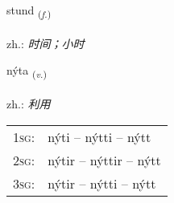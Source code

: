 \documentclass[frontgrid, backgrid]{flacards}\usepackage[]{graphicx}\usepackage[]{xcolor}
\begin{document}
\renewcommand{\flhead}{\vskip5pt \fboxsep=0pt {\small\bfseries\footnotesize Nafnorð | 名词}}
\renewcommand{\fcfoot}{\vskip5pt \fboxsep=0pt \hspace{2pt}{\small\bfseries\footnotesize 1K}}

\renewcommand{\blhead}{\vskip5pt {\small\bfseries\footnotesize Nafnorð | 名词 }}
\renewcommand{\bcfoot}{\vskip5pt \hspace{2pt}{\small\bfseries\footnotesize 1K}}


{stund \small{\textsubscript{(\textit{f.})}} \\[1ex] %
\textphonetic{[stʏnt]} \\
zh.: \emph{时间；小时} \\  [2ex]
\renewcommand*{\arraystretch}{0.8}
}

\renewcommand{\flhead}{\vskip5pt \fboxsep=0pt {\small\bfseries\footnotesize Sagnorð | 动词}}
\renewcommand{\fcfoot}{\vskip5pt \fboxsep=0pt \hspace{2pt}{\small\bfseries\footnotesize 1K}}

\renewcommand{\blhead}{\vskip5pt {\small\bfseries\footnotesize Sagnorð | 动词 }}
\renewcommand{\bcfoot}{\vskip5pt \hspace{2pt}{\small\bfseries\footnotesize 1K}}


{nýta \small{\textsubscript{(\textit{v.})}} \\[1ex] %
\textphonetic{[niːta]} \\
zh.: \emph{利用} \\  [2ex]
\renewcommand*{\arraystretch}{0.8}
\begin{tabular}{p{1cm}l}
\textsc{1sg}: & nýti -- nýtti -- nýtt \\ 
\textsc{2sg}: & nýtir -- nýttir -- nýtt \\ 
\textsc{3sg}: & nýtir -- nýtti -- nýtt \\ 
\end{tabular}
}
\end{document}
